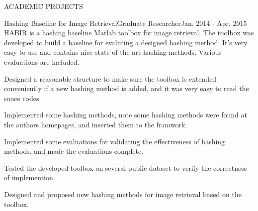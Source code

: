 \documentclass{resume} %
\begin{document}
\begin{rSection}{ACADEMIC PROJECTS}

\begin{pSubsection}{Hashing Baseline for Image Retrieval}{Graduate Researcher}{Jan. 2014 - Apr. 2015}
{HABIR is a hashing baseline Matlab toolbox for image retrieval. The toolbox was developed to build a baseline for evaluting a designed hashing method. It's very easy to use and contains nice state-of-the-art hashing methods. Various evaluations are included.
}
\item Designed a reasonable structure to make sure the toolbox is extended conveniently if a new hashing method is added, and it was very easy to read the souce codes.
\item Implemented some hashing methods, note some hashing methods were found at the authors homepages, and inserted them to the framwork.
\item Implemented some evaluations for validating the effectiveness of hashing methods, and made the evaluations complete.
\item Tested the developed toolbox on several public dataset to verify the correctness of implemention.
\item Designed and proposed new hashing methods for image retrieval based on the toolbox.
\end{pSubsection}
\end{rSection}


\end{document}

